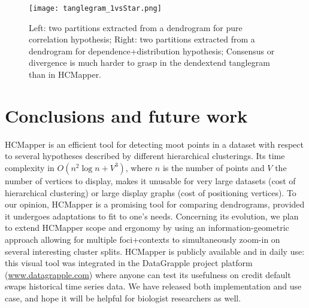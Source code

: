 \documentclass[10pt,conference,a4paper]{IEEEtran}
\begin{document}
\begin{figure}[htb]
	\texttt{[image: tanglegram\_1vsStar.png]}
      \caption{\label{fig:Tanglegram1Star}
            Left: two partitions extracted from a dendrogram for pure correlation hypothesis; Right: two partitions extracted from a dendrogram for dependence+distribution hypothesis; Consensus or divergence is much harder to grasp in the dendextend tanglegram \cite{galili2015dendextend} than in HCMapper.}
\end{figure}




\section{Conclusions and future work}


HCMapper is an efficient tool for detecting moot points in a dataset with respect to several hypotheses described by different hierarchical clusterings. Its time complexity in $O(n^2 \log n + V^3)$, where $n$ is the number of points and $V$ the number of vertices to display,  makes it unusable for very large datasets (cost of hierarchical clustering) or large display graphs (cost of positioning vertices).
To our opinion, HCMapper is a promising tool for comparing dendrograms, provided it undergoes adaptations to fit to one's needs. Concerning its evolution, we plan to extend HCMapper scope and ergonomy by using an information-geometric approach \cite{Nock:2013:ILM:2542355.2542378} allowing for multiple foci+contexts to simultaneously zoom-in on several interesting cluster splits. 
HCMapper is publicly available and in daily use: this visual tool was  
integrated in the DataGrapple project platform (\url{www.datagrapple.com}) where anyone can test its usefulness on credit default swaps historical time series data.
We have released both implementation and use case, and hope it will be helpful for biologist researchers as well.









\end{document}
